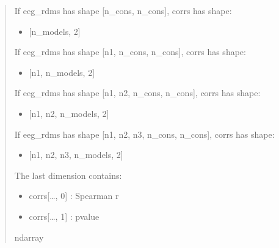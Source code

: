 \documentclass[letterpaper,10pt,english]{sphinxhowto}
\begin{document}
\begin{fulllineitems}
\begin{quote}
\begin{description}
\sphinxAtStartPar
If eeg\_rdms has shape {[}n\_cons, n\_cons{]}, corrs has shape:
\begin{itemize}
\item {} 
\sphinxAtStartPar
{[}n\_models, 2{]}

\end{itemize}

\sphinxAtStartPar
If eeg\_rdms has shape {[}n1, n\_cons, n\_cons{]}, corrs has shape:
\begin{itemize}
\item {} 
\sphinxAtStartPar
{[}n1, n\_models, 2{]}

\end{itemize}

\sphinxAtStartPar
If eeg\_rdms has shape {[}n1, n2, n\_cons, n\_cons{]}, corrs has shape:
\begin{itemize}
\item {} 
\sphinxAtStartPar
{[}n1, n2, n\_models, 2{]}

\end{itemize}

\sphinxAtStartPar
If eeg\_rdms has shape {[}n1, n2, n3, n\_cons, n\_cons{]}, corrs has shape:
\begin{itemize}
\item {} 
\sphinxAtStartPar
{[}n1, n2, n3, n\_models, 2{]}

\end{itemize}

\sphinxAtStartPar
The last dimension contains:
\begin{itemize}
\item {} 
\sphinxAtStartPar
corrs{[}…, 0{]} : Spearman r

\item {} 
\sphinxAtStartPar
corrs{[}…, 1{]} : p\sphinxhyphen{}value

\end{itemize}


\sphinxAtStartPar
ndarray

\end{description}\end{quote}

\end{fulllineitems}

\end{document}
